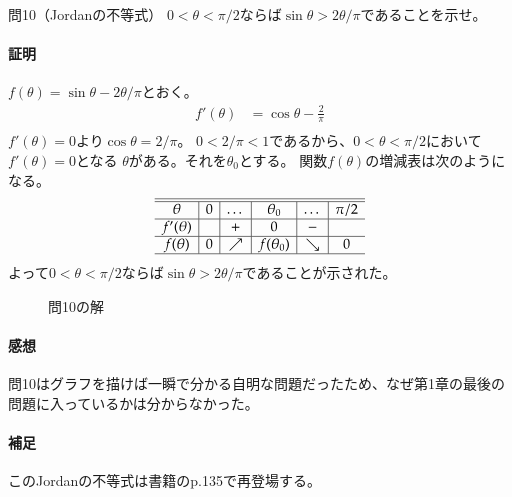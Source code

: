\begin{mysimplebox}{問10（Jordanの不等式）}
    $0<\theta<\pi/2$ならば$\sin\theta>2\theta/\pi$であることを示せ。
\end{mysimplebox}
\paragraph{証明}
$f(\theta)=\sin\theta-2\theta/\pi$とおく。
\begin{align*}
    f'(\theta)&=\cos\theta-\frac{2}{\pi}\\
\end{align*}
$f'(\theta)=0$より$\cos\theta=2/\pi$。
$0<2/\pi<1$であるから、$0<\theta<\pi/2$において$f'(\theta)=0$となる
$\theta$がある。それを$\theta_0$とする。
関数$f(\theta)$の増減表は次のようになる。
\begin{align*}
    \begin{array}{c|c|c|c|c|c}\hline\hline
        \theta     & 0 & \dots    & \theta_0 & \dots & \pi/2 \\ \hline
        f'(\theta) &   & +        & 0        & -        & \\ \hline
        f(\theta)  & 0 & \nearrow & f(\theta_0)        & \searrow & 0 \\ \hline
    \end{array}
\end{align*}
よって$0<\theta<\pi/2$ならば$\sin\theta>2\theta/\pi$であることが示された。
\begin{figure}[t]
    \centering
    \scalebox{0.6}{}
    \caption{問10の解}
\end{figure}
\paragraph{感想}
問10はグラフを描けば一瞬で分かる自明な問題だったため、なぜ第1章の最後の問題に入っているかは分からなかった。

\paragraph{補足}
このJordanの不等式は書籍のp.135で再登場する。